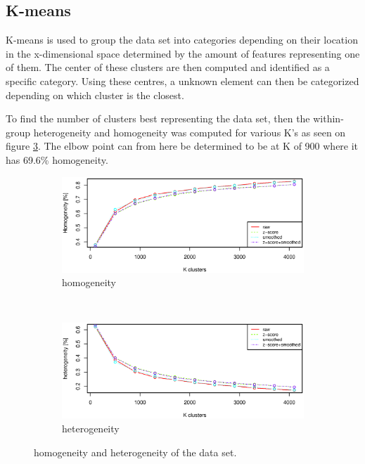 \subsection{K-means}
K-means is used to group the data set into categories depending on their location in the x-dimensional space determined by the amount of features representing one of them.
The center of these clusters are then computed and identified as a specific category.
Using these centres, a unknown element can then be categorized depending on which cluster is the closest.

To find the number of clusters best representing the data set, then the within-group heterogeneity and homogeneity was computed for various K's as seen on figure \ref{fig:elbow_point}.
The elbow point can from here be determined to be at K of 900 where it has 69.6\% homogeneity.


\begin{figure}[H]
\centering
\begin{subfigure}{0.70\textwidth}
\centering
\includegraphics[width=\textwidth]{graphics/homogenity}
\caption{homogeneity}
\label{fig:homogeneity_kmean}
\end{subfigure}\\[-1cm]
\begin{subfigure}{0.70\textwidth}
\centering
\includegraphics[width=\textwidth]{graphics/heterogenity}
\caption{heterogeneity}
\label{fig:heterogeneity_kmean}
\end{subfigure}
\caption[K means elbow point]{homogeneity and heterogeneity of the data set.}
\label{fig:elbow_point}
\end{figure}


